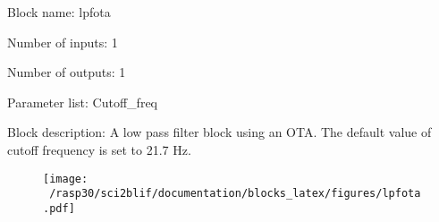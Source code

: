 \pagebreak

Block name: lpfota

Number of inputs: 1

Number of outputs: 1

Parameter list: Cutoff\_freq

Block description: 
A low pass filter block using an OTA. The default value of cutoff frequency is set to 21.7 Hz.

\begin{figure}[H]  %
\texttt{[image: ~/rasp30/sci2blif/documentation/blocks\_latex/figures/lpfota.pdf]}
\end{figure}

